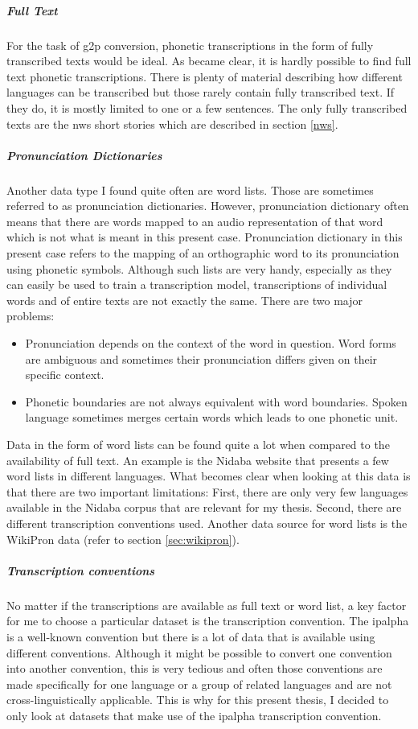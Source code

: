\subparagraph{Full Text}
For the task of \ac{g2p} conversion, phonetic transcriptions in the form of fully transcribed texts would be ideal. As became clear, it is hardly possible to find full text phonetic transcriptions. There is plenty of material describing how different languages can be transcribed but those rarely contain fully transcribed text. If they do, it is mostly limited to one or a few sentences. The only fully transcribed texts are the \ac{nws} short stories which are described in section \ref{nws}.

\subparagraph{Pronunciation Dictionaries}
Another data type I found quite often are word lists. Those are sometimes referred to as pronunciation dictionaries. However, pronunciation dictionary often means that there are words mapped to an audio representation of that word which is not what is meant in this present case. Pronunciation dictionary in this present case refers to the mapping of an orthographic word to its pronunciation using phonetic symbols. Although such lists are very handy, especially as they can easily be used to train a transcription model, transcriptions of individual words and of entire texts are not exactly the same. There are two major problems:

\begin{itemize}
\item Pronunciation depends on the context of the word in question. Word forms are ambiguous and sometimes their pronunciation differs given on their specific context. 
\item Phonetic boundaries are not always equivalent with word boundaries. Spoken language sometimes merges certain words which leads to one phonetic unit.
\end{itemize} 

Data in the form of word lists can be found quite a lot when compared to the availability of full text. An example is the Nidaba website that presents a few word lists in different languages. What becomes clear when looking at this data is that there are two important limitations: First, there are only very few languages available in the Nidaba corpus that are relevant for my thesis. Second, there are different transcription conventions used. Another data source for word lists is the WikiPron data (refer to section \ref{sec:wikipron}). 

\subparagraph{Transcription conventions}
No matter if the transcriptions are available as full text or word list, a key factor for me to choose a particular dataset is the transcription convention. The \ac{ipalpha} is a well-known convention but there is a lot of data that is available using different conventions. Although it might be possible to convert one convention into another convention, this is very tedious and often those conventions are made specifically for one language or a group of related languages and are not cross-linguistically applicable. This is why for this present thesis, I decided to only look at datasets that make use of the \ac{ipalpha} transcription convention.

